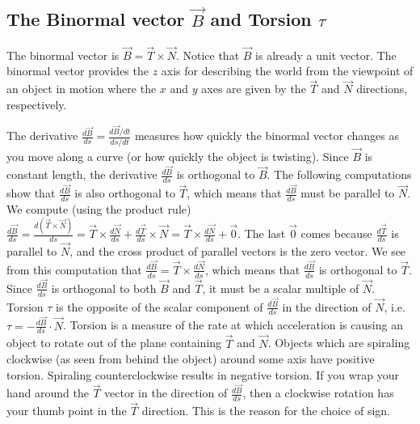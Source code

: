 \subsection{The Binormal vector $\vec B$ and Torsion $\tau$}
The binormal vector is {$ \vec B=\vec T \times \vec N $}. Notice that $\vec
B$ is already a unit vector. The binormal vector provides the {$z$}
axis for describing the world from the viewpoint of an object in
motion where the {$ x $} and {$ y $} axes are given by the {$ \vec T
$} and {$ \vec N $} directions, respectively. 

The derivative $ \frac{d\vec B}{ds}  = \frac{d\vec B /dt}{ds/dt}$
measures how quickly the binormal vector changes as you move along a
curve (or how quickly the object is twisting).  Since {$ \vec B $} is
constant length, the derivative {$ \frac{d\vec B}{ds} $} is orthogonal
to {$ \vec B $}.  The following computations show that {$ \frac{d\vec
B}{ds} $} is also orthogonal to $\vec T$, which means that {$
\frac{d\vec B}{ds} $} must be parallel to $\vec N$. We compute (using
the product rule) {$ \frac{d\vec B}{ds} = \frac{d(\vec T\times \vec N)}{ds}
= \vec T\times \frac{d\vec N}{ds}+ \frac{d\vec T}{ds}\times \vec N = \vec T\times
\frac{d\vec N}{ds}+\vec 0 $}. The last $\vec 0$ comes because {$
\frac{d\vec T}{ds} $} is parallel to {$ \vec N $}, and the cross
product of parallel vectors is the zero vector. We see from this
computation that {$ \frac{d\vec B}{ds} = \vec T\times \frac{d\vec N}{ds}
$}, which means that {$ \frac{d\vec B}{ds} $} is orthogonal to {$ \vec
T $}.  Since {$ \frac{d\vec B}{ds} $} is orthogonal to both {$ \vec B
$} and {$ \vec T $}, it must be a scalar multiple of {$ \vec N $}. 
Torsion {$ \tau $} is the opposite of the scalar component of {$
\frac{d\vec B}{ds} $} in the direction of {$ \vec N $}, i.e. {$
\tau=-\frac{d\vec B}{ds}\cdot \vec N $}. Torsion is a measure of the rate at
which acceleration is causing an object to rotate out of the plane
containing {$ \vec T $} and {$ \vec N $}. Objects which are spiraling
clockwise (as seen from behind the object) around some axis have
positive torsion. Spiraling counterclockwise results in negative
torsion. If you wrap your hand around the $\vec T$ vector in the
direction of {$ \frac{d\vec B}{ds} $}, then a clockwise rotation has
your thumb point in the $\vec T$ direction.  This is the reason for
the choice of sign.

